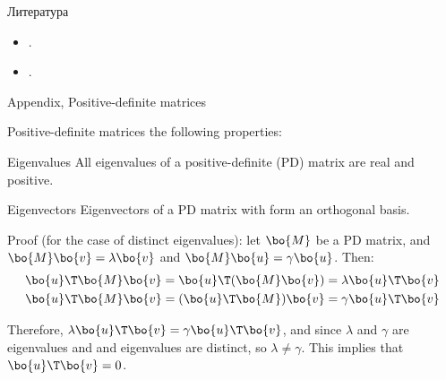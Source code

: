 \documentclass{beamer}
\begin{document}
\begin{frame}{Литература}
	\begin{flushleft}
		
		\begin{itemize}
			\item {}.
			
			\item {}.
			
			
		\end{itemize}
		
		
	\end{flushleft}
\end{frame}


\myqrframe




\begin{frame}{Appendix, Positive-definite matrices}
	\begin{flushleft}
		
		Positive-definite matrices the following properties:
		
		\begin{block}{Eigenvalues}
			All eigenvalues of a positive-definite (PD) matrix are real and positive.
		\end{block}
		
		\begin{block}{Eigenvectors}
			Eigenvectors of a PD matrix with form an orthogonal basis.
		\end{block}
		
		Proof (for the case of distinct eigenvalues): let $\bo{M}$ be a PD matrix, and $\bo{M}\bo{v} = \lambda \bo{v}$ and  $\bo{M}\bo{u} = \gamma \bo{u}$. Then:
		\begin{align}
			\bo{u}\T\bo{M}\bo{v} = \bo{u}\T(\bo{M}\bo{v})= \lambda \bo{u}\T \bo{v} \\
			\bo{u}\T\bo{M}\bo{v} = (\bo{u}\T\bo{M})\bo{v}= \gamma \bo{u}\T \bo{v}
		\end{align}
		
		Therefore, $ \lambda \bo{u}\T \bo{v}= \gamma \bo{u}\T \bo{v}$, and since $\lambda$ and $ \gamma$ are eigenvalues and and eigenvalues are distinct, so $\lambda \neq \gamma$. This implies that $\bo{u}\T \bo{v} = 0$.
		
	\end{flushleft}
\end{frame}
\end{document}
